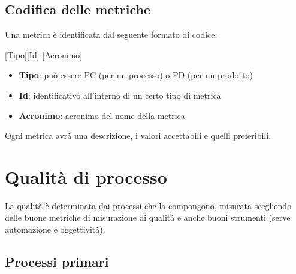 \documentclass[a4paper,10pt]{article}
\begin{document}
\subsection{Codifica delle metriche}
Una metrica è identificata dal seguente formato di codice: 
\begin{center}
    [Tipo][Id]-[Acronimo]
\end{center}
\begin{itemize}
    \item \textbf{Tipo}: può essere PC (per un processo) o PD (per un prodotto)
    \item \textbf{Id}: identificativo all'interno di un certo tipo di metrica
    \item \textbf{Acronimo}: acronimo del nome della metrica
\end{itemize}
Ogni metrica avrà una descrizione, i valori accettabili e quelli preferibili.

\section{Qualità di processo}
La qualità è determinata dai processi che la compongono, misurata scegliendo delle buone metriche di misurazione di qualità e anche buoni strumenti (serve automazione e oggettività). 
\subsection{Processi primari}
\end{document}
